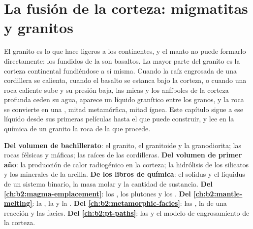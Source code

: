 \chapter{La fusión de la corteza: migmatitas y granitos}\label{ch:b2:crustal-melting}

El granito es lo que hace ligeros a los continentes, y el manto no puede formarlo directamente: los
fundidos de la  son basaltos. La mayor parte del granito es la corteza continental fundiéndose a sí misma.
Cuando la raíz engrosada de una cordillera se calienta, cuando el basalto se estanca bajo la corteza, o cuando una
roca caliente sube y su presión baja, las micas y los anfíboles de la corteza profunda ceden
su agua, aparece un líquido granítico entre los granos, y la roca se convierte en una
, mitad metamórfica, mitad ígnea. Este capítulo sigue a ese líquido desde sus primeras
películas hasta el  que puede construir, y lee en la química de un granito la roca de la que
procede.

\begin{recall}
\textbf{Del volumen de bachillerato}: el granito, el granitoide y la granodiorita; las rocas félsicas y máficas;
las raíces de las cordilleras. \textbf{Del volumen de primer año}: la producción de calor
radiogénico en la corteza; la hidrólisis de los silicatos y los minerales de la arcilla. \textbf{De los libros de química}: el solidus y el liquidus
de un sistema binario, la masa molar y la cantidad de sustancia. \textbf{Del
\cref{ch:b2:magma-emplacement}}: los , los plutones y los . \textbf{Del
\cref{ch:b2:mantle-melting}}: la , la  y la . \textbf{Del \cref{ch:b2:metamorphic-facies}}: las , la  de
una reacción y las facies. \textbf{Del \cref{ch:b2:pt-paths}}: las  y el
modelo de engrosamiento de la corteza.
\end{recall}

